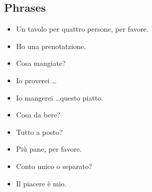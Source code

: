 \newpage

\subsection{Phrases}
\begin{itemize}
    \item Un tavolo per quattro persone, per favore.\\
    \item Ho una prenotatzione. \\
    \item Cosa mangiate? \\
    \item Io proverei \ldots \\
    \item Io mangerei \ldots questo piatto.\\
    \item Cosa da bere? \\
    \item Tutto a posto? \\
    \item Più pane, per favore. \\
    \item Conto unico o separato? \\
    \item Il piacere è mio. \\
\end{itemize}

